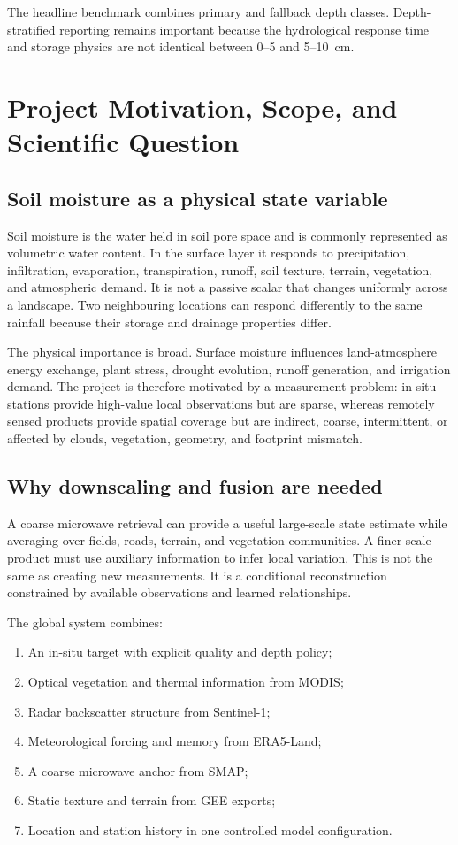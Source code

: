 \documentclass[12pt,a4paper]{report}
\newcommand{\feat}[1]{#1\par}
\begin{document}
\feat{The headline benchmark combines primary and fallback depth classes.
Depth-stratified reporting remains important because the hydrological response
time and storage physics are not identical between 0--5 and 5--10~cm.}

\section{Project Motivation, Scope, and Scientific Question}

\subsection{Soil moisture as a physical state variable}
Soil moisture is the water held in soil pore space and is commonly represented
as volumetric water content. In the surface layer it responds to precipitation,
infiltration, evaporation, transpiration, runoff, soil texture, terrain,
vegetation, and atmospheric demand. It is not a passive scalar that changes
uniformly across a landscape. Two neighbouring locations can respond
differently to the same rainfall because their storage and drainage properties
differ.

The physical importance is broad. Surface moisture influences land-atmosphere
energy exchange, plant stress, drought evolution, runoff generation, and
irrigation demand. The project is therefore motivated by a measurement
problem: in-situ stations provide high-value local observations but are sparse,
whereas remotely sensed products provide spatial coverage but are indirect,
coarse, intermittent, or affected by clouds, vegetation, geometry, and
footprint mismatch.

\subsection{Why downscaling and fusion are needed}
A coarse microwave retrieval can provide a useful large-scale state estimate
while averaging over fields, roads, terrain, and vegetation communities. A
finer-scale product must use auxiliary information to infer local variation.
This is not the same as creating new measurements. It is a conditional
reconstruction constrained by available observations and learned relationships.

The global system combines:
\begin{enumerate}
    \item An in-situ target with explicit quality and depth policy;
    \item Optical vegetation and thermal information from MODIS;
    \item Radar backscatter structure from Sentinel-1;
    \item Meteorological forcing and memory from ERA5-Land;
    \item A coarse microwave anchor from SMAP;
    \item Static texture and terrain from GEE exports;
    \item Location and station history in one controlled model configuration.
\end{enumerate}
\end{document}
